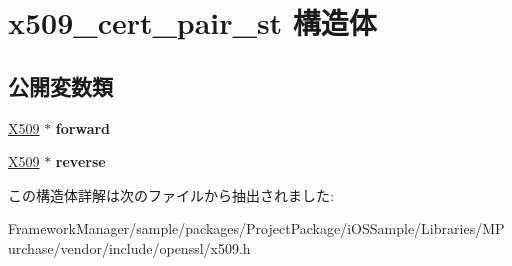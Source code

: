 \hypertarget{structx509__cert__pair__st}{}\section{x509\+\_\+cert\+\_\+pair\+\_\+st 構造体}
\label{structx509__cert__pair__st}
\subsection*{公開変数類}
\begin{DoxyCompactItemize}
\item 
\hypertarget{structx509__cert__pair__st_a6187bc9b7943e8089be772b2657cfc65}{}\hyperlink{structx509__st}{X509} $\ast$ {\bfseries forward}\label{structx509__cert__pair__st_a6187bc9b7943e8089be772b2657cfc65}

\item 
\hypertarget{structx509__cert__pair__st_acf854c09163ea3c9a79890aa13dee3bd}{}\hyperlink{structx509__st}{X509} $\ast$ {\bfseries reverse}\label{structx509__cert__pair__st_acf854c09163ea3c9a79890aa13dee3bd}

\end{DoxyCompactItemize}


この構造体詳解は次のファイルから抽出されました\+:\begin{DoxyCompactItemize}
\item 
Framework\+Manager/sample/packages/\+Project\+Package/i\+O\+S\+Sample/\+Libraries/\+M\+Purchase/vendor/include/openssl/x509.\+h\end{DoxyCompactItemize}
